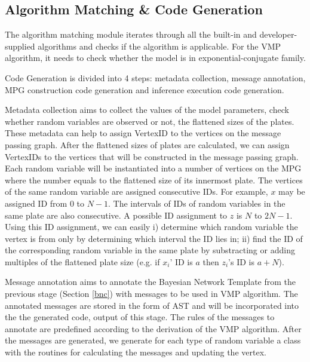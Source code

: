 \subsection{Algorithm Matching \& Code Generation}

The algorithm matching module iterates through all the built-in and
developer-supplied algorithms and checks if the algorithm is applicable.  For
the VMP algorithm, it needs to check whether the model is in
exponential-conjugate family. 

Code Generation is divided into 4 steps: metadata
collection, message annotation, MPG construction code generation and inference
execution code generation.

Metadata collection aims to collect the values of the model parameters,
check whether random variables are observed or not, the flattened sizes of the plates.
These metadata can help to 
assign VertexID to the vertices on the message passing graph.  
After the flattened sizes of plates are calculated, we can assign VertexIDs to the
vertices that will be constructed in the message passing graph. Each random
variable will be instantiated into a number of vertices on the MPG where the
number equals to the flattened size of its innermost plate. The vertices
of the same random variable are assigned consecutive IDs. For example, $x$ may
be assigned ID from $0$ to $N-1$. The intervals of IDs of random variables in
the same plate are also consecutive. A possible ID assignment to $z$ is $N$ to
$2N - 1$. Using this ID assignment, we can easily i) determine which random
variable the vertex is from only by determining which interval the ID lies
in; ii) find the ID of the corresponding random variable in the same plate by
substracting or adding multiples of the flattened plate size (e.g. if $x_i$' ID is
$a$ then $z_i$'s ID is $a + N$).

Message annotation aims to annotate the Bayesian Network Template from the previous stage (Section \ref{bnc})
with messages
to be used in VMP algorithm.  The annotated messages are stored in the form of
AST and will be incorporated into the the generated code, output of this stage. 
The rules of the messages to annotate are predefined according to the
derivation of the VMP algorithm.
%
After the messages are generated, we
generate for each type of random variable a class with the routines for
calculating the messages and updating the vertex. 


